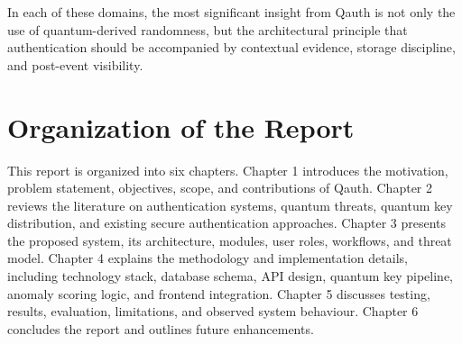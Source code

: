 In each of these domains, the most significant insight from Qauth is not only the use of quantum-derived randomness, but the architectural principle that authentication should be accompanied by contextual evidence, storage discipline, and post-event visibility.

\section{Organization of the Report}
This report is organized into six chapters. Chapter 1 introduces the motivation, problem statement, objectives, scope, and contributions of Qauth. Chapter 2 reviews the literature on authentication systems, quantum threats, quantum key distribution, and existing secure authentication approaches. Chapter 3 presents the proposed system, its architecture, modules, user roles, workflows, and threat model. Chapter 4 explains the methodology and implementation details, including technology stack, database schema, API design, quantum key pipeline, anomaly scoring logic, and frontend integration. Chapter 5 discusses testing, results, evaluation, limitations, and observed system behaviour. Chapter 6 concludes the report and outlines future enhancements.
